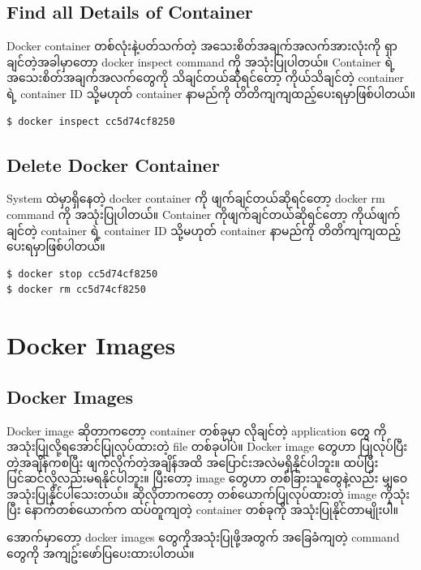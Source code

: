 \documentclass{article}
\begin{document}
\subsection{Find all Details of
Container}\label{find-all-details-of-container}

Docker container တစ်လုံးနဲ့ပတ်သက်တဲ့ အသေးစိတ်အချက်အလက်အားလုံးကို
ရှာချင်တဲ့အခါမှာတော့ docker inspect command ကို အသုံးပြုပါတယ်။ Container
ရဲ့ အသေးစိတ်အချက်အလက်တွေကို သိချင်တယ်ဆိုရင်တော့ ကိုယ်သိချင်တဲ့ container
ရဲ့ container ID သို့မဟုတ် container နာမည်ကို
တိတိကျကျထည့်ပေးရမှာဖြစ်ပါတယ်။

\begin{verbatim}
$ docker inspect cc5d74cf8250
\end{verbatim}

\subsection{Delete Docker Container}\label{delete-docker-container}

System ထဲမှာရှိနေတဲ့ docker container ကို ဖျက်ချင်တယ်ဆိုရင်တော့ docker
rm command ကို အသုံးပြုပါတယ်။ Container ကိုဖျက်ချင်တယ်ဆိုရင်တော့
ကိုယ်ဖျက်ချင်တဲ့ container ရဲ့ container ID သို့မဟုတ် container နာမည်ကို
တိတိကျကျထည့်ပေးရမှာဖြစ်ပါတယ်။

\begin{verbatim}
$ docker stop cc5d74cf8250
$ docker rm cc5d74cf8250
\end{verbatim}

\pagebreak


\section{Docker Images}\label{docker-images}

\subsection{Docker Images}\label{docker-images-1}

Docker image ဆိုတာကတော့ container တစ်ခုမှာ လိုချင်တဲ့ application တွေ
ကိုအသုံးပြုလို့ရအောင်ပြုလုပ်ထားတဲ့ file တစ်ခုပါပဲ။ Docker image တွေဟာ
ပြုလုပ်ပြီးတဲ့အချိန်ကစပြီး ဖျက်လိုက်တဲ့အချိန်အထိ
အပြောင်းအလဲမရှိနိုင်ပါဘူး။ ထပ်ပြီးပြင်ဆင်လို့လည်းမရနိုင်ပါဘူး။ ပြီးတော့
image တွေဟာ တစ်ခြားသူတွေနဲ့လည်း မျှဝေအသုံးပြုနိုင်ပါသေးတယ်။
ဆိုလိုတာကတော့ တစ်ယောက်ပြုလုပ်ထားတဲ့ image ကိုသုံးပြီး နောက်တစ်ယောက်က
ထပ်တူကျတဲ့ container တစ်ခုကို အသုံးပြုနိုင်တာမျိုးပါ။

အောက်မှာတော့ docker images တွေကိုအသုံးပြုဖို့အတွက် အခြေခံကျတဲ့ command
တွေကို အကျဥ်းဖော်ပြပေးထားပါတယ်။
\end{document}
